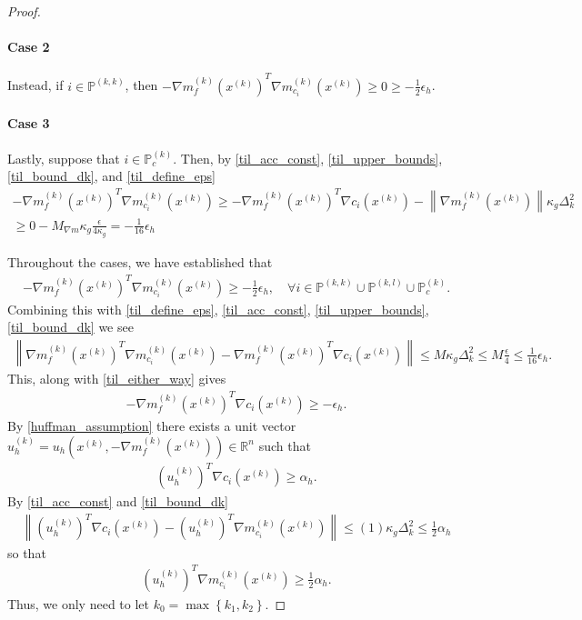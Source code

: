 \documentclass{article}
\theoremstyle{case}
\numberwithin{theorem}{subsection}
\newcommand{\dk}{\Delta_k}
\newcommand{\gk}{{\nabla m_f^{(k)}\left(\xk\right)}}
\newcommand{\gmcik}{{\nabla m_{c_i}^{(k)}\left(\xk\right)}}
\newcommand{\gmcil}{{\nabla m_{c_i}^{(l)}\left(\xl\right)}}
\newcommand{\Rn}{\mathbb R^n}
\newcommand{\xk}{x^{(k)}}
\newcommand{\xl}{{x^{(l)}}}
\newcommand{\trueactiveprojk}{{\mathbb P_c^{(k)}}}
\newcommand{\activeprojkk}{{\mathbb P^{(k, k)}}}
\newcommand{\activeprojkl}{{\mathbb P^{(k, l)}}}
\newcommand{\maxmodelgrad}{{M_{\nabla m}}}
\newcommand{\huffeps}{{\epsilon_h}}
\newcommand{\huffalpha}{{\alpha_h}}
\newcommand{\huffdir}{{u_h}}
\newcommand{\huffdirk}{{u^{(k)}_h}}
\begin{document}
\begin{proof}
\paragraph{Case 2}
Instead, if $i \in \activeprojkk$, then $-\gk^T \gmcik \ge 0 \ge - \frac 1 2 \huffeps$.

\paragraph{Case 3}
Lastly, suppose that $i \in \trueactiveprojk$.
Then, by \cref{til_acc_const}, \cref{til_upper_bounds}, \cref{til_bound_dk}, and \cref{til_define_eps}
\begin{align*}
-\gk^T \gmcik \ge -\gk^T \nabla c_i\left(\xk\right) - \left\|\gk\right\| \kappa_g \dk^2 \\
\ge 0 - \maxmodelgrad \kappa_g \frac{\epsilon}{4\kappa_g} 
=  - \frac{1}{16 } \huffeps
\end{align*}


Throughout the cases, we have established that
\begin{align}
\label{til_either_way}
-\gk^T \gmcik \ge - \frac 1 2 \huffeps, \quad \forall i \in \activeprojkk \cup \activeprojkl \cup \trueactiveprojk.
\end{align}
Combining this with \cref{til_define_eps}, \cref{til_acc_const}, \cref{til_upper_bounds}, \cref{til_bound_dk} we see
\begin{align*}
\left\| \gk^T \gmcik - \gk^T \nabla c_i \left(\xk\right)\right\| 
\le M\kappa_g\dk^2 
\le M\frac {\epsilon} {4} \le \frac 1 {16} \huffeps.
\end{align*}
This, along with \cref{til_either_way} gives
\begin{align*}
-\gk^T \nabla c_i \left(\xk\right) \ge -\huffeps.
\end{align*}
By \cref{huffman_assumption} there exists a unit vector $\huffdirk = \huffdir\left(\xk, -\gk\right) \in \Rn$ such that
\begin{align*}
\left(\huffdirk\right)^T \nabla c_i \left(\xk\right) \ge \huffalpha.
\end{align*}
By \cref{til_acc_const} and \cref{til_bound_dk}
\begin{align*}
\left\|
\left(\huffdirk\right)^T \nabla c_i \left(\xk\right) -
\left(\huffdirk\right)^T \gmcik
\right\|
\le ( 1 ) \kappa_g \dk^2 
\le \frac 1 2 \huffalpha
\end{align*}
so that
\begin{align*}
\left(\huffdirk\right)^T \gmcik \ge \frac 1 2 \huffalpha.
\end{align*}
Thus, we only need to let $k_0 = \max\left\{k_1, k_2\right\}$.
% 
% 


\end{proof}
\end{document}
